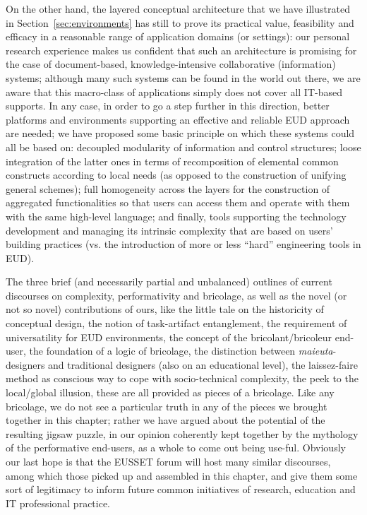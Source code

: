 \documentclass{article}
\begin{document}
On the other hand, the layered conceptual architecture that we have illustrated in Section~\ref{sec:environments} has still to prove its practical value, feasibility and efficacy in a reasonable range of application domains (or settings): our personal research experience makes us confident that such an architecture is promising for the case of document-based, knowledge-intensive collaborative (information) systems; although many such systems can be found in the world out there, we are aware that this macro-class of applications simply does not cover all IT-based supports.  In any case, in order to go a step further in this direction, better platforms and environments supporting an effective and reliable EUD approach are needed; we have proposed some basic principle on which these systems could all be based on: decoupled modularity of information and control structures; loose integration of the latter ones in terms of recomposition of elemental common constructs according to local needs (as opposed to the construction of unifying general schemes); full homogeneity across the layers for the construction of aggregated functionalities so that users can access them and operate with them with the same high-level language; and finally, tools supporting the technology development and managing its intrinsic complexity that are based on users' building practices (vs. the introduction of more or less ``hard'' engineering tools in EUD).





The three brief (and necessarily partial and unbalanced) outlines of current discourses on complexity, performativity and bricolage, as well as the novel (or not so novel) contributions of ours, like the little tale on the historicity of conceptual design, the notion of task-artifact entanglement, the requirement of universatility for EUD environments, the concept of the bricolant/bricoleur end-user, the foundation of a logic of bricolage, the distinction between \emph{maieuta}-designers and traditional designers (also on an educational level), the laissez-faire method as conscious way to cope with socio-technical complexity, the peek to the local/global illusion, these are all provided as pieces of a bricolage. Like any bricolage, we do not see a particular truth in any of the pieces we brought together in this chapter; rather we have argued about the potential of the resulting jigsaw puzzle, in our opinion coherently kept together by the mythology of the performative end-users, as a whole to come out being use-ful. Obviously our last hope is that the EUSSET forum will host many similar discourses, among which those picked up and assembled in this chapter, and give them some sort of legitimacy to inform future common initiatives of research, education and IT professional practice.
\end{document}
